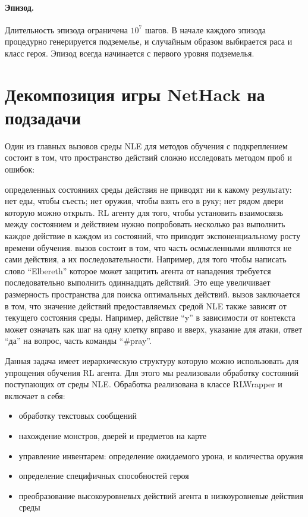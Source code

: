 \paragraph{Эпизод.}
Длительность эпизода ограничена $10^7$ шагов. В начале каждого эпизода процедурно генерируется подземелье, и случайным образом выбирается раса и класс героя. Эпизод всегда начинается с первого уровня подземелья. 


\section{Декомпозиция игры NetHack на подзадачи}

Один из главных вызовов среды NLE для методов обучения с подкреплением состоит в том, что пространство действий сложно исследовать методом проб и ошибок:

\begin{itemize}
     определенных состояниях среды действия не приводят ни к какому результату: нет еды, чтобы съесть; нет оружия, чтобы взять его в руку; нет рядом двери которую можно открыть. RL агенту для того, чтобы установить взаимосвязь между состоянием и действием нужно попробовать несколько раз выполнить каждое действие в каждом из состояний, что приводит экспоненциальному росту времени обучения. 
     вызов состоит в том, что часть осмысленными являются не сами действия, а их последовательности. Например, для того чтобы написать слово ``Elbereth'' которое может защитить агента от нападения требуется последовательно выполнить одиннадцать действий. Это еще увеличивает размерность пространства для поиска оптимальных действий. 
     вызов заключается в том, что значение действий предоставляемых средой NLE также зависят от текущего состояния среды. Например, действие ``y'' в зависимости от контекста может означать как шаг на одну клетку вправо и вверх, указание для атаки, ответ ``да'' на вопрос, часть команды ``\#pray''.
\end{itemize}

Данная задача имеет иерархическую структуру которую можно использовать для упрощения обучения RL агента. Для этого мы реализовали обработку состояний поступающих от среды NLE. Обработка реализована в классе RLWrapper и включает в себя:

\begin{itemize}
    \item обработку текстовых сообщений
    \item нахождение монстров, дверей и предметов на карте
    \item управление инвентарем: определение ожидаемого урона, и количества оружия
    \item определение специфичных способностей героя
    \item преобразование высокоуровневых действий агента в низкоуровневые действия среды
\end{itemize}


